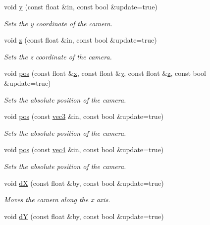 \begin{DoxyCompactItemize}
void \hyperlink{class_camera_a5021b8379a853f306851837178856db0}{y} (const float \&in, const bool \&update=true)
\begin{DoxyCompactList}\small\item\em Sets the y coordinate of the camera. \end{DoxyCompactList}\item 
void \hyperlink{class_camera_a4acfa20291c83f13c98781c0d53cdbd8}{z} (const float \&in, const bool \&update=true)
\begin{DoxyCompactList}\small\item\em Sets the z coordinate of the camera. \end{DoxyCompactList}\item 
void \hyperlink{class_camera_a432e03c15d63f8839fe4731016d907a4}{pos} (const float \&\hyperlink{class_camera_a14d59ca64bf258adacbed4e0e70ba701}{x}, const float \&\hyperlink{class_camera_a5021b8379a853f306851837178856db0}{y}, const float \&\hyperlink{class_camera_a4acfa20291c83f13c98781c0d53cdbd8}{z}, const bool \&update=true)
\begin{DoxyCompactList}\small\item\em Sets the absolute position of the camera. \end{DoxyCompactList}\item 
void \hyperlink{class_camera_ae9dc2206b71b25cf320a05d148cb8b56}{pos} (const \hyperlink{struct_angel_1_1vec3}{vec3} \&in, const bool \&update=true)
\begin{DoxyCompactList}\small\item\em Sets the absolute position of the camera. \end{DoxyCompactList}\item 
void \hyperlink{class_camera_aec2115038562e514193bb2b67f5da153}{pos} (const \hyperlink{struct_angel_1_1vec4}{vec4} \&in, const bool \&update=true)
\begin{DoxyCompactList}\small\item\em Sets the absolute position of the camera. \end{DoxyCompactList}\item 
void \hyperlink{class_camera_ac7985a6cb48f4e1e74fda17e5213dd74}{d\-X} (const float \&by, const bool \&update=true)
\begin{DoxyCompactList}\small\item\em Moves the camera along the x axis. \end{DoxyCompactList}\item 
void \hyperlink{class_camera_a59570a88e3ff2d277c9e995372fcadfe}{d\-Y} (const float \&by, const bool \&update=true)

\end{DoxyCompactItemize}
